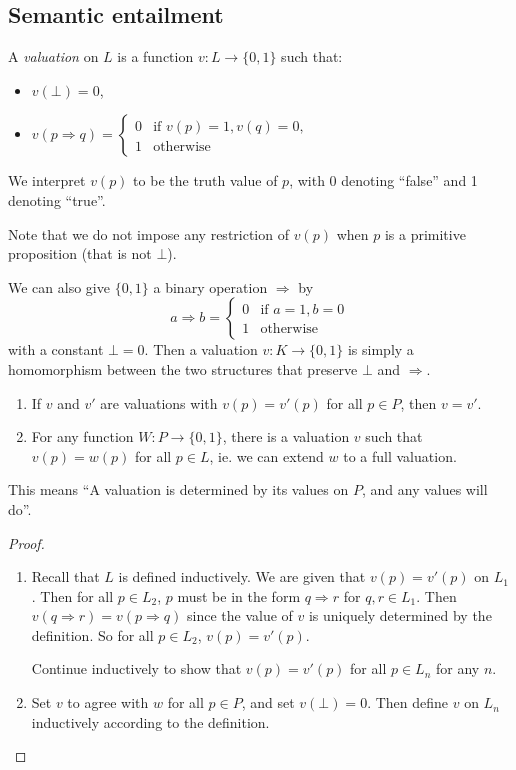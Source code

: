 \documentclass[a4paper]{article}
\begin{document}
\subsection{Semantic entailment}
\begin{defi}[Valuation]
  A \emph{valuation} on $L$ is a function $v: L\to \{0, 1\}$ such that:
  \begin{itemize}
  \item $v(\bot) = 0$,
  \item $v(p\Rightarrow q) = \begin{cases} 0 & \text{if }v(p) = 1, v(q) = 0,\\1 & \text{otherwise}\end{cases}$
  \end{itemize}
  We interpret $v(p)$ to be the truth value of $p$, with 0 denoting ``false'' and 1 denoting ``true''.

  Note that we do not impose any restriction of $v(p)$ when $p$ is a primitive proposition (that is not $\bot$).
\end{defi}

We can also give $\{0, 1\}$ a binary operation $\Rightarrow$ by
\[
  a\Rightarrow b = \begin{cases}
    0 & \text{if }a = 1, b = 0\\
    1 & \text{otherwise}
  \end{cases}
\]
with a constant $\bot = 0$. Then a valuation $v: K\to \{0, 1\}$ is simply a homomorphism between the two structures that preserve $\bot$ and $\Rightarrow $.

\begin{prop}\leavevmode
  \begin{enumerate}
    \item If $v$ and $v'$ are valuations with $v(p) = v'(p)$ for all $p\in P$, then $v = v'$.
    \item For any function $W: P \to \{0, 1\}$, there is a valuation $v$ such that $v(p) = w(p)$ for all $p\in L$, ie. we can extend $w$ to a full valuation.
  \end{enumerate}
  This means ``A valuation is determined by its values on $P$, and any values will do''.
\end{prop}

\begin{proof}\leavevmode
  \begin{enumerate}
    \item Recall that $L$ is defined inductively. We are given that $v(p) = v'(p)$ on $L_1$. Then for all $p\in L_2$, $p$ must be in the form $q\Rightarrow r$ for $q, r\in L_1$. Then $v(q\Rightarrow r) = v(p\Rightarrow q)$ since the value of $v$ is uniquely determined by the definition. So for all $p\in L_2$, $v(p) = v'(p)$.

      Continue inductively to show that $v(p) = v'(p)$ for all $p\in L_n$ for any $n$.
    
    \item Set $v$ to agree with $w$ for all $p\in P$, and set $v(\bot) = 0$. Then define $v$ on $L_n$ inductively according to the definition.
  \end{enumerate}
\end{proof}
\end{document}
